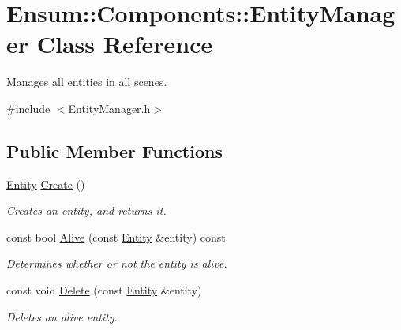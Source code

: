 \hypertarget{class_ensum_1_1_components_1_1_entity_manager}{}\section{Ensum\+:\+:Components\+:\+:Entity\+Manager Class Reference}
\label{class_ensum_1_1_components_1_1_entity_manager}


Manages all entities in all scenes.  




{\ttfamily \#include $<$Entity\+Manager.\+h$>$}

\subsection*{Public Member Functions}
\begin{DoxyCompactItemize}
\item 
\hyperlink{class_ensum_1_1_components_1_1_entity}{Entity} \hyperlink{class_ensum_1_1_components_1_1_entity_manager_a15c2795c73d625bcc2399bf59cea64b5}{Create} ()\hypertarget{class_ensum_1_1_components_1_1_entity_manager_a15c2795c73d625bcc2399bf59cea64b5}{}\label{class_ensum_1_1_components_1_1_entity_manager_a15c2795c73d625bcc2399bf59cea64b5}

\begin{DoxyCompactList}\small\item\em Creates an entity, and returns it. \end{DoxyCompactList}\item 
const bool \hyperlink{class_ensum_1_1_components_1_1_entity_manager_aa30d3768a9f92b138a52b7ac7c6045cc}{Alive} (const \hyperlink{class_ensum_1_1_components_1_1_entity}{Entity} \&entity) const \hypertarget{class_ensum_1_1_components_1_1_entity_manager_aa30d3768a9f92b138a52b7ac7c6045cc}{}\label{class_ensum_1_1_components_1_1_entity_manager_aa30d3768a9f92b138a52b7ac7c6045cc}

\begin{DoxyCompactList}\small\item\em Determines whether or not the entity is alive. \end{DoxyCompactList}\item 
const void \hyperlink{class_ensum_1_1_components_1_1_entity_manager_aaa8e8f7e613b8b8d8b707dd80a43aec5}{Delete} (const \hyperlink{class_ensum_1_1_components_1_1_entity}{Entity} \&entity)\hypertarget{class_ensum_1_1_components_1_1_entity_manager_aaa8e8f7e613b8b8d8b707dd80a43aec5}{}\label{class_ensum_1_1_components_1_1_entity_manager_aaa8e8f7e613b8b8d8b707dd80a43aec5}

\begin{DoxyCompactList}\small\item\em Deletes an alive entity. \end{DoxyCompactList}\end{DoxyCompactItemize}
